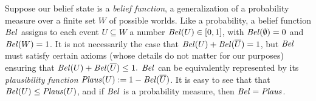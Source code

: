 \begin{example}

 	\label{ex:shafer}
Suppose our belief state is a
\emph{belief function},
a generalization of a probability measure over
a finite set $W$ of possible worlds.
%
%
\def\complem#1{\overline{ #1}}%
%
Like a probability, a belief function $\mathit{Bel}$ assigns to each event
$U \subseteq W$ a number $\mathit{Bel}(U) \in [0,1]$,
with
$\mathit{Bel}(\emptyset) = 0$ and $\mathit{Bel}(W) = 1$.
It is not necessarily the case that
$\Bel(U) + \Bel(\complem{U}) = 1$, but $\mathit{Bel}$
must satisfy certain axioms (whose details do not matter for our purposes)
ensuring that
$
	\Bel(U) + \Bel(\complem{U}) \le 1.
$
$\mathit{Bel}$ can be equivalently represented by its
\emph{plausibility function}
$\Plaus(U) := 1 - \Bel(\complem{U})$.
It is easy to see that that $\mathit{Bel}(U) \le \mathit{Plaus}(U)$, and 
if $\mathit{Bel}$ is a probability measure, then
$\mathit{Bel} = \mathit{Plaus}$.


\end{example}
